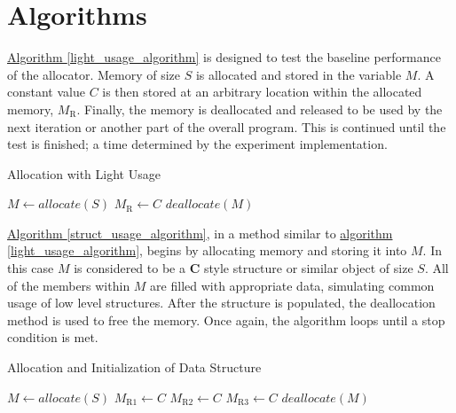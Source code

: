 \documentclass[letterpaper, 10 pt, conference]{ieeeconf}  %
\begin{document}
\section{Algorithms}

\hyperref[light_usage_algorithm]{Algorithm \ref*{light_usage_algorithm}} is designed to test the baseline performance of the allocator.
Memory of size $S$ is allocated and stored in the variable $M$.
A constant value $C$ is then stored at an arbitrary location within the allocated memory, $M_\text{R}$.
Finally, the memory is deallocated and released to be used by the next iteration or another part of the overall program.
This is continued until the test is finished; a time determined by the experiment implementation.

\begin{algorithm}[h]
  \caption{Allocation with Light Usage}
  \label{light_usage_algorithm}
  \begin{algorithmic}
      \STATE $M \leftarrow allocate(S)$
      \STATE $M_\text{R} \leftarrow C$
      \STATE $deallocate(M)$
    \ENDWHILE
  \end{algorithmic}
\end{algorithm}

\hyperref[struct_usage_algorithm]{Algorithm \ref*{struct_usage_algorithm}}, in a method similar to \hyperref[light_usage_algorithm]{algorithm \ref*{light_usage_algorithm}}, begins by allocating memory and storing it into $M$.
In this case $M$ is considered to be a \textbf{C} style structure or similar object of size $S$. 
All of the members within $M$ are filled with appropriate data, simulating common usage of low level structures.
After the structure is populated, the deallocation method is used to free the memory.
Once again, the algorithm loops until a stop condition is met.

\begin{algorithm}[h]
  \caption{Allocation and Initialization of Data Structure}
  \label{struct_usage_algorithm}
  \begin{algorithmic}
      \STATE $M \leftarrow allocate(S)$
      \STATE $M_\text{R1} \leftarrow C$
      \STATE $M_\text{R2} \leftarrow C$
      \STATE $M_\text{R3} \leftarrow C$
      \STATE $deallocate(M)$
    \ENDWHILE
  \end{algorithmic}
\end{algorithm}
\end{document}
